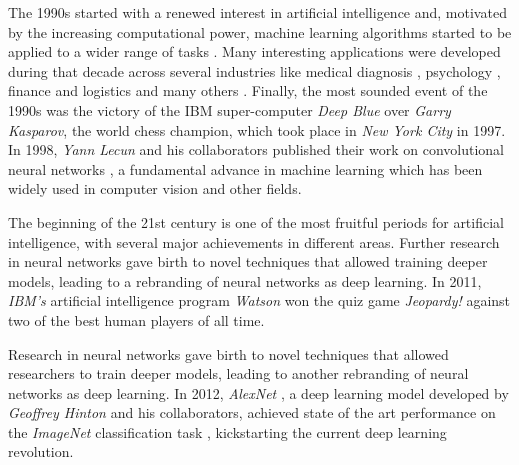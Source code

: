 The 1990s started with a renewed interest in artificial intelligence and, motivated by the increasing computational power, machine learning algorithms started to be applied to a wider range of tasks \autocite{Tesauro:1995}. Many interesting applications were developed during that decade across several industries like medical diagnosis \autocite{declaris1991, Klein1991, punch1992, Cinar1999}, psychology \autocite{Dorrer1995, denby1999, Ogawa1999, Perlovsky1999}, finance and logistics \autocite{Lipshutz1991, Benaroch1991, Johnson1991, Falas1994} and many others \autocite{Smithers1993, Yoo1994, Mashaly1994, Koyma1998}. Finally, the most sounded event of the 1990s was the victory of the IBM super-computer \textit{Deep Blue} \autocite{Campbell2002} over \textit{Garry Kasparov}, the world chess champion, which took place in \textit{New York City} in 1997. In 1998, \textit{Yann Lecun} and his collaborators published their work on convolutional neural networks \autocite{lecun1999}, a fundamental advance in machine learning which has been widely used in computer vision and other fields. 

The beginning of the 21st century is one of the most fruitful periods for artificial intelligence, with several major achievements in different areas. Further research in neural networks \autocite{hinton2006, hinton2012} gave birth to novel techniques that allowed training deeper models, leading to a rebranding of neural networks as deep learning. In 2011, \textit{IBM's} artificial intelligence program \textit{Watson} won the quiz game \textit{Jeopardy!} against two of the best human players of all time. 

Research in neural networks gave birth to novel techniques that allowed researchers to train deeper models, leading to another rebranding of neural networks as deep learning. In 2012, \textit{AlexNet} \autocite{krizhevsky2012}, a deep learning model developed by \textit{Geoffrey Hinton} and his collaborators, achieved state of the art performance on the \textit{ImageNet} classification task \autocite{ILSVRC15}, kickstarting the current deep learning revolution. 

